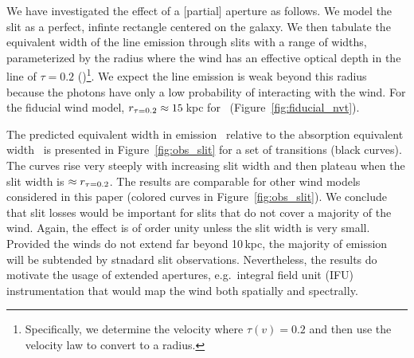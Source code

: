 \documentclass[12pt,preprint]{aastex}
\begin{document}
We have investigated the effect of a [partial] aperture as follows.
We model the slit as a perfect, infinte rectangle centered on the
galaxy.  We then tabulate the equivalent width of the line emission
through slits with a range of widths, parameterized by the radius
where the wind has an effective optical depth in the line of $\tau =
0.2$ (\rtt)\footnote{Specifically, we determine the
  velocity where $\tau(v) = 0.2$ and then use the velocity law to
  convert to a radius.}.   We expect the line emission is weak beyond
this radius because the photons have only a low probability of
interacting with the wind.  For the fiducial wind model, $r_{\tau = 0.2}
\approx 15$\,kpc for \mgiia\ (Figure~\ref{fig:fiducial_nvt}).  

The predicted equivalent width in emission \ewe\ relative to the absorption
equivalent width \ewabs\ is presented in
Figure~\ref{fig:obs_slit} for a set of transitions (black curves).
The curves rise very steeply with increasing slit width and then
plateau when the slit width is $\approx r_{\tau = 0.2}$.  
The results are comparable for other wind models considered
in this paper (colored curves in Figure~\ref{fig:obs_slit}).
We conclude that slit losses would be important for slits that do not
cover a majority of the wind.   Again, the effect is of order unity
unless the slit width is very small.   Provided the winds do not
extend far beyond 10\,kpc, the majority of emission will be subtended
by stnadard slit observations.  Nevertheless, the results do motivate
the usage of extended apertures, e.g.\ integral field unit (IFU)
instrumentation that would map the wind both spatially and spectrally.
\end{document}
